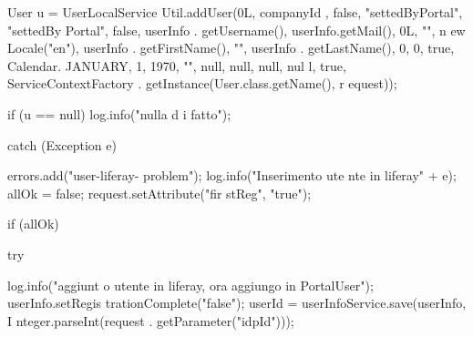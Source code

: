 \begin{DoxyCode}
{{{{{{                                                        User u = UserLocalService
      Util.addUser(0L,
                                                                        companyId
      , false, "settedByPortal",
                                                                        "settedBy
      Portal", false, userInfo
                                                                                        .
      getUsername(), userInfo.getMail(),
                                                                        0L, "", n
      ew Locale("en"), userInfo
                                                                                        .
      getFirstName(), "", userInfo
                                                                                        .
      getLastName(), 0, 0, true,
                                                                        Calendar.
      JANUARY, 1, 1970, "", null, null,
                                                                        null, nul
      l, true, ServiceContextFactory
                                                                                        .
      getInstance(User.class.getName(),
                                                                                                        r
      equest));

                                                        if (u == null)
                                                                log.info("nulla d
      i fatto");

                                                } catch (Exception e) {

                                                        errors.add("user-liferay-
      problem");
                                                        log.info("Inserimento ute
      nte in liferay" + e);
                                                        allOk = false;
                                                        request.setAttribute("fir
      stReg", "true");
                                                }

                                                if (allOk) {
                                                        try {

                                                                log.info("aggiunt
      o utente in liferay, ora aggiungo in PortalUser");
                                                                userInfo.setRegis
      trationComplete("false");
                                                                userId = 
      userInfoService.save(userInfo,
                                                                                I
      nteger.parseInt(request
                                                                                                .
      getParameter("idpId")));

}}}}}}}
\end{DoxyCode}
